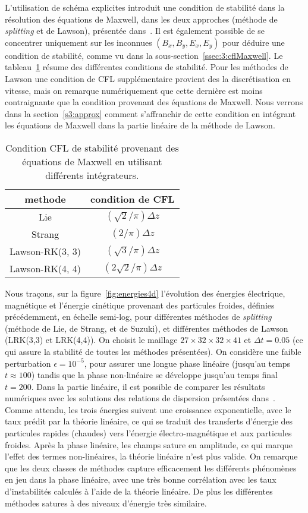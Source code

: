 L'utilisation de schéma explicites introduit une condition de stabilité dans la résolution des équations de Maxwell, dans les deux approches (méthode de \emph{splitting} et de Lawson), présentée dans~\cite{Kormann:2021}. Il est également possible de se concentrer uniquement sur les inconnues $(B_x,B_y,E_x,E_y)$ pour déduire une condition de stabilité, comme vu dans la sous-section~\ref{ssec:3:cflMaxwell}. Le tableau~\ref{tab:CFL_maxwell} résume des différentes conditions de stabilité. Pour les méthodes de Lawson une condition de CFL supplémentaire provient des la discrétisation en vitesse, mais on remarque numériquement que cette dernière est moins contraignante que la condition provenant des équations de Maxwell. Nous verrons dans la section~\ref{s3:approx} comment s'affranchir de cette condition en intégrant les équations de Maxwell dans la partie linéaire de la méthode de Lawson.

\begin{table}[h]
  \centering
  \begin{tabular}{c|c}
    methode         & condition de CFL          \\
    \hline
    Lie             & $(\sqrt{2}/\pi) \Delta z$ \\ 
    Strang          & $(2/\pi)\Delta z$         \\
    Lawson-RK(3, 3) & $(\sqrt{3}/\pi)\Delta z$  \\ 
    Lawson-RK(4, 4) & $(2\sqrt{2}/\pi) \Delta z$  
  \end{tabular}
  \caption{Condition CFL de stabilité provenant des équations de Maxwell en utilisant différents intégrateurs.} 
  \label{tab:CFL_maxwell}
\end{table}

Nous traçons, sur la figure~\ref{fig:energies4d} l'évolution des énergies électrique, magnétique et l'énergie cinétique provenant des particules froides, définies précédemment, en échelle semi-log, pour différentes méthodes de \emph{splitting} (méthode de Lie, de Strang, et de Suzuki), et différentes méthodes de Lawson (LRK(3,3) et LRK(4,4)). On choisit le maillage $27\times32\times32\times41$ et $\Delta t=0.05$ (ce qui assure la stabilité de toutes les méthodes présentées). On considère une faible perturbation $\epsilon = 10^{-5}$, pour assurer une longue phase linéaire (jusqu'au temps $t\approx 100$) tandis que la phase non-linéaire se développe jusqu'au temps final $t=200$. Dans la partie linéaire, il est possible de comparer les résultats numériques avec les solutions des relations de dispersion présentées dans~\cite{Holderied:2020}. Comme attendu, les trois énergies suivent une croissance exponentielle, avec le taux prédit par la théorie linéaire, ce qui se traduit des transferts d'énergie des particules rapides (chaudes) vers l'énergie électro-magnétique et aux particules froides. Après la phase linéaire, les champs sature en amplitude, ce qui marque l'effet des termes non-linéaires, la théorie linéaire n'est plus valide. On remarque que les deux classes de méthodes capture efficacement les différents phénomènes en jeu dans la phase linéaire, avec une très bonne corrélation avec les taux d'instabilités calculés à l'aide de la théorie linéaire. De plus les différentes méthodes satures à des niveaux d'énergie très similaire.

